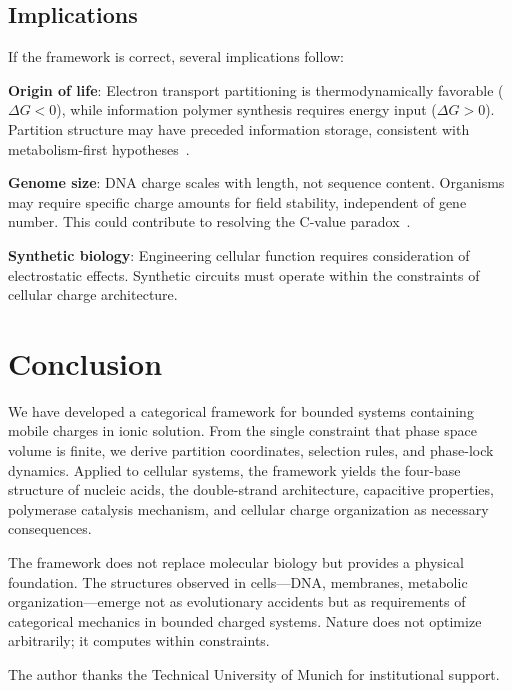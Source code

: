 \documentclass[twocolumn,aps,prb,superscriptaddress,longbibliography,floatfix]{revtex4-2}
\theoremstyle{remark}
\begin{document}
\subsection{Implications}

If the framework is correct, several implications follow:

\textbf{Origin of life}: Electron transport partitioning is
thermodynamically favorable ($\Delta G < 0$), while information polymer
synthesis requires energy input ($\Delta G > 0$). Partition structure
may have preceded information storage, consistent with metabolism-first
hypotheses~\cite{Wachtershauser1988}.

\textbf{Genome size}: DNA charge scales with length, not sequence
content. Organisms may require specific charge amounts for field
stability, independent of gene number. This could contribute to
resolving the C-value paradox~\cite{Gregory2005}.

\textbf{Synthetic biology}: Engineering cellular function requires
consideration of electrostatic effects. Synthetic circuits must operate
within the constraints of cellular charge architecture.

\section{Conclusion}
\label{sec:conclusion}

We have developed a categorical framework for bounded systems containing
mobile charges in ionic solution. From the single constraint that phase
space volume is finite, we derive partition coordinates, selection rules,
and phase-lock dynamics. Applied to cellular systems, the framework
yields the four-base structure of nucleic acids, the double-strand
architecture, capacitive properties, polymerase catalysis mechanism, and
cellular charge organization as necessary consequences.

The framework does not replace molecular biology but provides a physical
foundation. The structures observed in cells---DNA, membranes, metabolic
organization---emerge not as evolutionary accidents but as requirements
of categorical mechanics in bounded charged systems. Nature does not
optimize arbitrarily; it computes within constraints.

\begin{acknowledgments}
The author thanks the Technical University of Munich for institutional
support.
\end{acknowledgments}


\end{document}
